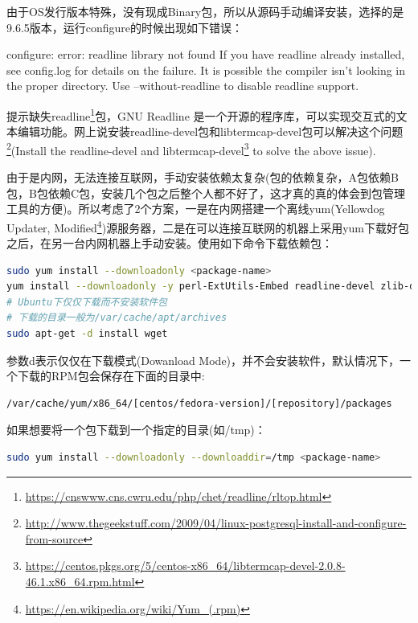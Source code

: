 \documentclass[12pt]{book}
\numberwithin{dummy}{section}
\theoremstyle{ocrenumbox}
\theoremstyle{blacknumex}
\theoremstyle{blacknumbox}
\theoremstyle{ocrenum}
\begin{document}
由于OS发行版本特殊，没有现成Binary包，所以从源码手动编译安装，选择的是9.6.5版本，运行configure的时候出现如下错误：

configure: error: readline library not found
If you have readline already installed, see config.log for details on the
failure.  It is possible the compiler isn't looking in the proper directory.
Use --without-readline to disable readline support.

提示缺失readline\footnote{\url{https://cnswww.cns.cwru.edu/php/chet/readline/rltop.html}}包，GNU Readline 是一个开源的程序库，可以实现交互式的文本编辑功能。网上说安装readline-devel包和libtermcap-devel包可以解决这个问题\footnote{\url{http://www.thegeekstuff.com/2009/04/linux-postgresql-install-and-configure-from-source}}(Install the readline-devel and libtermcap-devel\footnote{\url{https://centos.pkgs.org/5/centos-x86_64/libtermcap-devel-2.0.8-46.1.x86_64.rpm.html}} to solve the above issue).

由于是内网，无法连接互联网，手动安装依赖太复杂(包的依赖复杂，A包依赖B包，B包依赖C包，安装几个包之后整个人都不好了，这才真的真的体会到包管理工具的方便)。所以考虑了2个方案，一是在内网搭建一个离线yum(Yellowdog Updater, Modified\footnote{\url{https://en.wikipedia.org/wiki/Yum_(.rpm)}})源服务器，二是在可以连接互联网的机器上采用yum下载好包之后，在另一台内网机器上手动安装。使用如下命令下载依赖包：

\begin{lstlisting}[language=Bash]
sudo yum install --downloadonly <package-name>
yum install --downloadonly -y perl-ExtUtils-Embed readline-devel zlib-devel pam-devel libxml2-devel libxslt-devel openldap-devel python-devel gcc-c++ openssl-devel cmake
# Ubuntu下仅仅下载而不安装软件包
# 下载的目录一般为/var/cache/apt/archives
sudo apt-get -d install wget
\end{lstlisting}

参数d表示仅仅在下载模式(Dowanload Mode)，并不会安装软件，默认情况下，一个下载的RPM包会保存在下面的目录中:

\begin{lstlisting}[language=Bash]
/var/cache/yum/x86_64/[centos/fedora-version]/[repository]/packages 
\end{lstlisting}

如果想要将一个包下载到一个指定的目录(如/tmp)：

\begin{lstlisting}[language=Bash]
sudo yum install --downloadonly --downloaddir=/tmp <package-name> 
\end{lstlisting}
\end{document}
